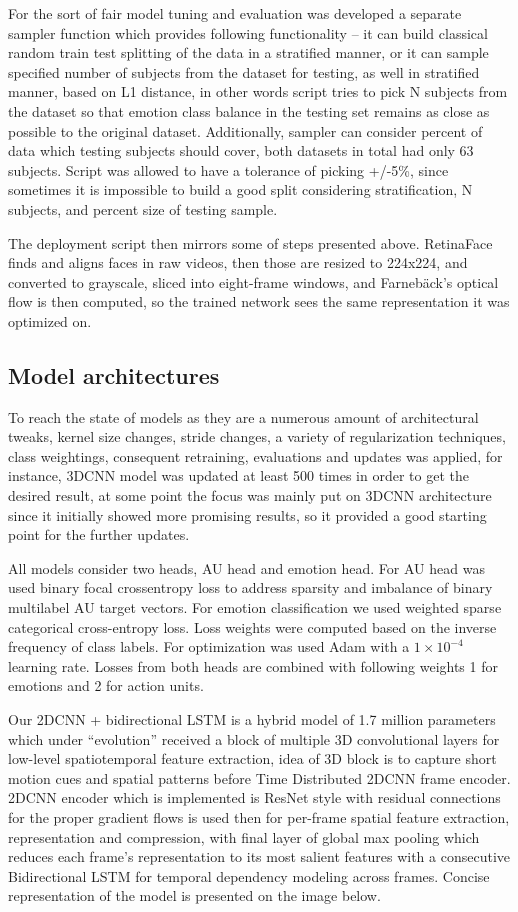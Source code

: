 \documentclass{article}
\begin{document}
For the sort of fair model tuning and evaluation was developed a separate sampler function which provides following functionality – it can build classical random train test splitting of the data in a stratified manner, or it can sample specified number of subjects from the dataset for testing, as well in stratified manner, based on L1 distance, in other words script tries to pick N subjects from the dataset so that emotion class balance in the testing set remains as close as possible to the original dataset. Additionally, sampler can consider percent of data which testing subjects should cover, both datasets in total had only 63 subjects. Script was allowed to have a tolerance of picking +/-5\%, since sometimes it is impossible to build a good split considering stratification, N subjects, and percent size of testing sample.

The deployment script then mirrors some of steps presented above. RetinaFace finds and aligns faces in raw videos, then those are resized to 224x224, and converted to grayscale, sliced into eight-frame windows, and Farnebäck’s optical flow is then computed, so the trained network sees the same representation it was optimized on.

\subsection{Model architectures}
To reach the state of models as they are a numerous amount of architectural tweaks, kernel size changes, stride changes, a variety of regularization techniques, class weightings, consequent retraining, evaluations and updates was applied, for instance, 3DCNN model was updated at least 500 times in order to get the desired result, at some point the focus was mainly put on 3DCNN architecture since it initially showed more promising results, so it provided a good starting point for the further updates.

All models consider two heads, AU head and emotion head. For AU head was used binary focal cross\-entropy loss to address sparsity and imbalance of binary multilabel AU target vectors. For emotion classification we used weighted sparse categorical cross-entropy loss. Loss weights were computed based on the inverse frequency of class labels. For optimization was used Adam with a $1 \times 10^{-4}$ learning rate. Losses from both heads are combined with following weights 1 for emotions and 2 for action units.

Our 2DCNN + bidirectional LSTM is a hybrid model of 1.7 million parameters which under “evolution” received a block of multiple 3D convolutional layers for low-level spatiotemporal feature extraction, idea of 3D block is to capture short motion cues and spatial patterns before Time Distributed 2DCNN frame encoder. 2DCNN encoder which is implemented is ResNet style with residual connections for the proper gradient flows is used then for per-frame spatial feature extraction, representation and compression, with final layer of global max pooling which reduces each frame’s representation to its most salient features with a consecutive Bidirectional LSTM for temporal dependency modeling across frames. Concise representation of the model is presented on the image below.
\end{document}
